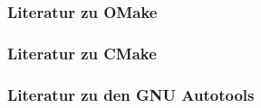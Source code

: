 \begin{frame}
	\frametitle{Literatur zu OMake}
	
\end{frame}

\begin{frame}
	\frametitle{Literatur zu CMake}
	
\end{frame}

\begin{frame}
	\frametitle{Literatur zu den GNU Autotools}
	
\end{frame}
